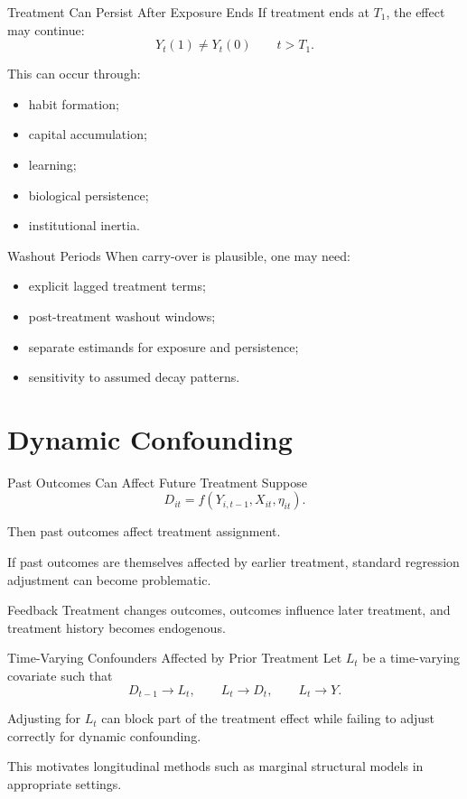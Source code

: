 \documentclass[aspectratio=169,11pt]{beamer}
\begin{document}
\begin{frame}{Treatment Can Persist After Exposure Ends}
If treatment ends at \(T_1\), the effect may continue:
\[
Y_t(1)\neq Y_t(0)
\qquad
t>T_1.
\]

This can occur through:
\begin{itemize}
\item habit formation;
\item capital accumulation;
\item learning;
\item biological persistence;
\item institutional inertia.
\end{itemize}
\end{frame}

\begin{frame}{Washout Periods}
When carry-over is plausible, one may need:
\begin{itemize}
\item explicit lagged treatment terms;
\item post-treatment washout windows;
\item separate estimands for exposure and persistence;
\item sensitivity to assumed decay patterns.
\end{itemize}
\end{frame}

\section{Dynamic Confounding}

\begin{frame}{Past Outcomes Can Affect Future Treatment}
Suppose
\[
D_{it}
=
f(Y_{i,t-1},X_{it},\eta_{it}).
\]

Then past outcomes affect treatment assignment.

If past outcomes are themselves affected by earlier treatment, standard regression adjustment can become problematic.

\begin{alertblock}{Feedback}
Treatment changes outcomes, outcomes influence later treatment, and treatment history becomes endogenous.
\end{alertblock}
\end{frame}

\begin{frame}{Time-Varying Confounders Affected by Prior Treatment}
Let \(L_t\) be a time-varying covariate such that
\[
D_{t-1}\rightarrow L_t,
\qquad
L_t\rightarrow D_t,
\qquad
L_t\rightarrow Y.
\]

Adjusting for \(L_t\) can block part of the treatment effect while failing to adjust correctly for dynamic confounding.

This motivates longitudinal methods such as marginal structural models in appropriate settings.
\end{frame}
\end{document}

